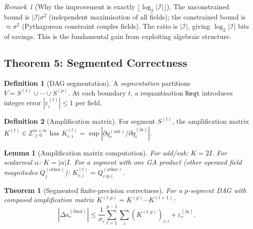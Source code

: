 \documentclass[11pt,a4paper]{article}
\theoremstyle{definition}
\newtheorem{definition}{Definition}[section]
\theoremstyle{plain}
\newtheorem{theorem}{Theorem}[section]
\newtheorem{lemma}{Lemma}[section]
\theoremstyle{remark}
\newtheorem{remark}{Remark}[section]
\begin{document}
\begin{remark}[Why the improvement is exactly $\lfloor\log_2|\mathcal{I}|\rfloor$]
The unconstrained bound is $|\mathcal{I}|\sigma^2$ (independent maximisation
of all fields); the constrained bound is $\approx\sigma^2$ (Pythagorean
constraint couples fields).
The ratio is $|\mathcal{I}|$, giving $\log_2|\mathcal{I}|$ bits of savings.
This is the fundamental gain from exploiting algebraic structure.
\end{remark}

\subsection{Theorem 5: Segmented Correctness}
\label{sec:segmented}

\begin{definition}[DAG segmentation]
A \emph{segmentation} partitions $V=S^{(1)}\cup\cdots\cup S^{(p)}$.
At each boundary $t$, a requantisation $\mathtt{Reqt}$ introduces integer
error $|\varepsilon_i^{(t)}|\le1$ per field.
\end{definition}

\begin{definition}[Amplification matrix]
For segment $S^{(t)}$, the amplification matrix $K^{(t)}\in\mathbb{Z}_{\ge0}^{m\times m}$
has $K^{(t)}_{r,i}=\sup|\partial q_r^{(\mathrm{out})}/\partial q_i^{(\mathrm{in})}|$.
\end{definition}

\begin{lemma}[Amplification matrix computation]
\label{lem:amp}
For add/sub: $K=2I$.
For scalarmul $\alpha$: $K=|\alpha|I$.
For a segment with one GA product (other operand field magnitudes $Q_j^{(\mathrm{other})}$):
$K^{(t)}_{r,i}=Q_{r\oplus i}^{(\mathrm{other})}$.
\end{lemma}

\begin{theorem}[Segmented finite-precision correctness]
\label{thm:segmented}
For a $p$-segment DAG with composed amplification matrix
$K^{(t:p)}=K^{(p)}\cdots K^{(t+1)}$:
\begin{equation}\label{eq:segmented-real}
  |\Delta a_r^{(\mathrm{final})}|
  \le \frac{1}{\sigma_r}\sum_{t=1}^{p-1}\sum_i(K^{(t:p)})_{r,i}
  + \varepsilon_r^{(\mathrm{in})}.
\end{equation}
\end{theorem}
\end{document}
